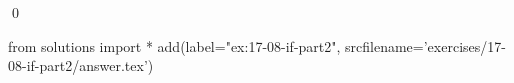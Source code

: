 
\begin{ex}
  \label{ex:17-08-if-part2}
  
  \qed
\end{ex}
\begin{python0}
from solutions import *
add(label="ex:17-08-if-part2",
    srcfilename='exercises/17-08-if-part2/answer.tex')
\end{python0}

